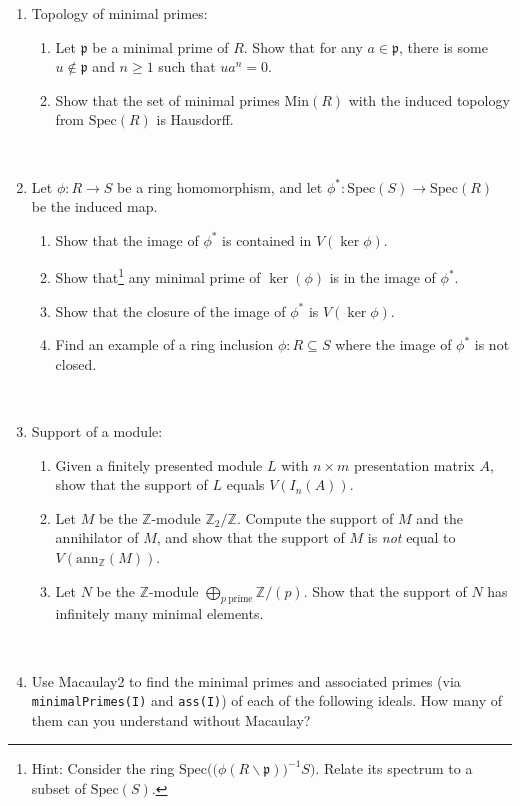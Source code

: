 \documentclass[12pt]{amsart}
\newcommand{\Q}{\mathbb{Q}}
\newcommand{\Z}{\mathbb{Z}}
\newcommand{\p}{\mathfrak{p}}
\newcommand{\Spec}{\mathrm{Spec}}
\newcommand{\Min}{\mathrm{Min}}
\begin{document}
\begin{enumerate}

\item Topology of minimal primes:
\begin{enumerate}
 \item Let $\p$ be a minimal prime of $R$. Show that for any $a\in \p$, there is some $u\notin \p$ and $n\geq 1$ such that $ua^n=0$.
\item Show that the set of minimal primes $\Min(R)$ with the induced topology from $\Spec(R)$ is Hausdorff.
\end{enumerate}

\

\item Let $\phi:R\to S$ be a ring homomorphism, and let $\phi^*:\Spec(S)\to \Spec(R)$ be the induced map.
\begin{enumerate}
\item Show that the image of $\phi^*$ is contained in $V(\ker \phi)$.
\item Show that\footnote{Hint: Consider the ring  $\Spec\Big( \big(\phi(R\smallsetminus \p)\big)^{-1} S\Big)$. Relate its spectrum to a subset of $\Spec(S)$.} any minimal prime of $\ker(\phi)$ is in the image of $\phi^*$.
\item Show that the closure of the image of $\phi^*$ is $V(\ker \phi)$.
\item Find an example of a ring inclusion $\phi:R\subseteq S$ where the image of $\phi^*$ is not closed.
\end{enumerate}

\

\item Support of a module: 
\begin{enumerate}
\item Given a finitely presented module $L$ with $n\times m$ presentation matrix $A$, show that the support of $L$ equals $V(I_n(A))$.
\item Let $M$ be the $\Z$-module $\Z_2/\Z$. Compute the support of $M$ and the annihilator of $M$, and show that the support of $M$ is \emph{not} equal to $V(\mathrm{ann}_{\Z}(M))$.
\item Let $N$ be the $\Z$-module $\bigoplus_{p \ \text{prime}} \Z/(p)$. Show that the support of $N$ has infinitely many minimal elements.
\end{enumerate}

\

\item Use Macaulay2 to find the minimal primes and associated primes (via \texttt{minimalPrimes(I)} and \texttt{ass(I)}) of each of the following ideals. How many of them can you understand without Macaulay?
\begin{enumerate}


\end{enumerate}
\end{enumerate}
\end{document}
